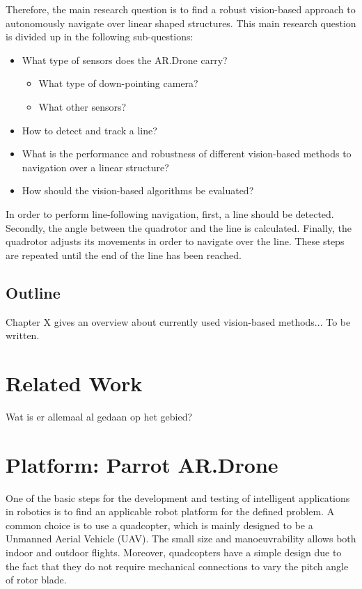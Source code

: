 \documentclass[a4paper]{article}
\begin{document}
Therefore, the main research question is to find a robust vision-based approach to autonomously navigate over linear shaped structures. This main research question is divided up in the following sub-questions:
\begin{itemize}
\item What type of sensors does the AR.Drone carry?
    \begin{itemize}
        \item What type of down-pointing camera?
        \item What other sensors?
    \end{itemize}
\item How to detect and track a line?
\item What is the performance and robustness of different vision-based methods to navigation over a linear structure?
\item How should the vision-based algorithms be evaluated?
\end{itemize}
In order to perform line-following navigation, first, a line should be detected. Secondly, the angle between the quadrotor and the line is calculated. Finally, the quadrotor adjusts its movements in order to navigate over the line. These steps are repeated until the end of the line has been reached.
\subsection{Outline}
Chapter X gives an overview about currently used vision-based methods...
To be written.

\section{Related Work}
Wat is er allemaal al gedaan op het gebied?

\section{Platform: Parrot AR.Drone}
One of the basic steps for the development and testing of intelligent applications in robotics is to find an applicable robot platform for the defined problem. A common choice is to use a quadcopter, which is  mainly designed to be a Unmanned Aerial Vehicle (UAV). The small size and manoeuvrability allows both indoor and outdoor flights. Moreover, quadcopters have a simple design due to the fact that they do not require mechanical connections to vary the pitch angle of rotor blade.
\end{document}
